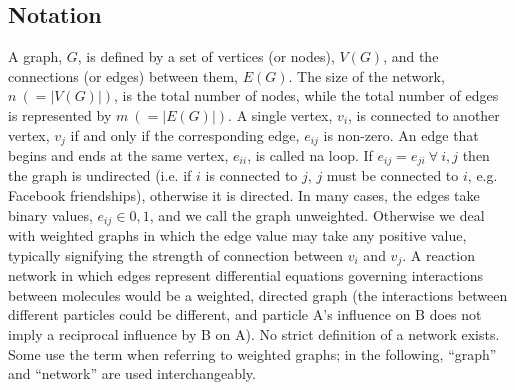 \documentclass[11pt]{article}
\begin{document}
\subsection{Notation}
A graph, $G$, is defined by a set of vertices (or nodes), $V(G)$, and the connections (or edges) between them, $E(G)$. The size of the network, $n \ ( = |V(G)|)$, is the total number of nodes, while the total number of edges is represented by $m \ (= |E(G)|)$. A single vertex, $v_{i}$, is connected to another vertex, $v_{j}$ if and only if the corresponding edge, $e_{ij}$ is non-zero. An edge that begins and ends at the same vertex, $e_{ii}$, is called na loop. If $e_{ij} = e_{ji} \ \forall \ i,j$ then the graph is undirected (i.e. if $i$ is connected to $j$, $j$ must be connected to $i$, e.g. Facebook friendships), otherwise it is directed. In many cases, the edges take binary values, $e_{ij} \in {0,1}$, and we call the graph unweighted. Otherwise we deal with weighted graphs in which the edge value may take any positive value, typically signifying the strength of connection between $v_{i}$ and $v_{j}$. A reaction network in which edges represent differential equations governing interactions between molecules would be a weighted, directed graph (the interactions between different particles could be different, and particle A's influence on B does not imply a reciprocal influence by B on A). No strict definition of a network exists. Some use the term when referring to weighted graphs; in the following, ``graph'' and ``network'' are used interchangeably. \vspace{1mm}
\end{document}
